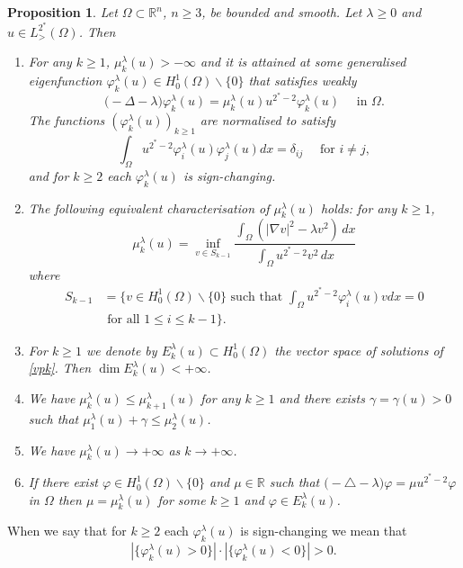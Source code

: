 \documentclass[10pt]{amsart}
\numberwithin{equation}{section}
\newcommand{\R}{\mathbb{R}}
\newcommand{\vp}{\varphi}
\newcommand{\Om}{\Omega}
\newcommand{\mkl}{\mu_{k}^{\lambda}}
\newcommand{\vkl}{\varphi_{k}^{\lambda}}
\newcommand{\vil}{\varphi_{i}^{\lambda}}
\newcommand{\vjl}{\varphi_{j}^{\lambda}}
\theoremstyle{plain}
\newtheorem{prop}{Proposition}[section]%
\theoremstyle{remark}
\begin{document}
\begin{prop} \label{prop:vp}
Let $\Om \subset \R^n$, $n \ge 3$, be bounded and smooth. Let $\lambda \ge0$ and $u \in L^{2^*}_>(\Om)$. Then
\begin{enumerate}
\item For any $k \ge 1$, $\mkl(u)> - \infty$ and it is attained at some generalised eigenfunction $\vkl(u) \in H^1_0(\Om) \backslash \{0\}$ that satisfies weakly
\begin{equation} \label{vpk}
\big( - \Delta - \lambda \big) \vkl(u) = \mu_{k}^{\lambda}(u) u^{2^*-2}    \vkl(u) \quad \text{ in } \Om.
\end{equation}
The functions $(\vkl(u))_{k \ge 1}$ are normalised to satisfy
\begin{equation} \label{norma} 
\int_\Om u^{2^*-2} \vil(u) \vjl(u) dx =  \delta_{ij} \quad \text{ for } i \neq j,
\end{equation}
and for $k \ge 2$ each $\vkl(u)$ is sign-changing. 
\item The following equivalent characterisation of $\mkl(u)$ holds: for any $k \ge 1$,
\begin{equation} \label{muk2}
\mkl(u) = \inf_{v \in S_{k-1}} \frac{\int_{\Om}\left(  |\nabla v|^2 - \lambda v^2 \right) \, dx}{\int_{\Om} u^{2^*-2} v^2 \, dx} 
\end{equation}
where 
$$\begin{aligned} 
S_{k-1} & = \Big\{ v \in H^1_0(\Om)  \backslash \{0\} \text{ such that } \int_\Om u^{2^*-2} \vil(u) v dx = 0 \\
&\text{ for all } 1 \le i \le k-1 \Big\}.
\end{aligned} $$
\item For $k \ge 1$ we denote by $E_k^{\lambda}(u) \subset H^1_0(\Om)$ the vector space of solutions of \eqref{vpk}. Then $\dim E_k^{\lambda}(u) < + \infty$.

\item We have $\mkl(u) \le \mu_{k+1}^{\lambda}(u)$ for any $k \ge 1$ and there exists $\gamma = \gamma (u) >0$ such that $ \mu_1^{\lambda}(u) + \gamma \le \mu_{2}^{\lambda}(u)$.
\item We have $\mkl(u) \to + \infty$ as $k \to + \infty$. 
\item If there exist $\vp \in H^1_0(\Om) \backslash \{0\}$ and $\mu \in \R$ such that $\big( - \triangle - \lambda \big) \vp = \mu u^{2^*-2} \vp$ in  $\Om$ then $\mu =\mkl(u)$ for some $k \ge 1$ and $\vp \in E_k^{\lambda}(u)$. 

 \end{enumerate}
\end{prop}
When we say that for $k \ge 2$ each $\vkl(u)$ is sign-changing we mean that 
$$|\{\vkl(u) >0 \}| \cdot |\{\vkl(u) <0 \}|  >0.$$ 
\end{document}
